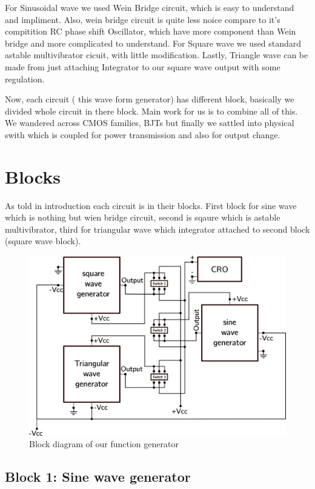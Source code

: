 \documentclass[12pt]{article}
\begin{document}
For Sinusoidal wave we used Wein Bridge circuit, which is easy to understand and impliment. Also, wein bridge circuit is quite less noice compare to it's compitition RC phase shift Oscillator, which have more component than Wein bridge and more complicated to understand. For Square wave we used standard astable multivibrator cicuit, with little modification. Lastly, Triangle wave can be made from just attaching Integrator to our square wave output with some regulation.

Now, each circuit ( this wave form generator) has different block, basically we divided whole circuit in there block. Main work for us is to combine all of this. We wandered across CMOS families, BJTs but finally we sattled into physical swith which is coupled for power transmission and also for output change.

\section{Blocks}
\label{sec:orgd72c047}


As told in introduction each circuit is in their blocks. First block for sine wave which is nothing but wien bridge circuit, second is sqaure which is astable multivibrator, third for triangular wave which integrator attached to second block (square wave block).


\begin{figure}[H]
  \centering
  \includegraphics[width=.95\textwidth]{imgs/blocks.png}
  \caption{\label{fig:orga90d092}Block diagram of our function generator}
\end{figure}

\subsection{Block 1: Sine wave generator}
\label{sec:org9924c80}
\end{document}
